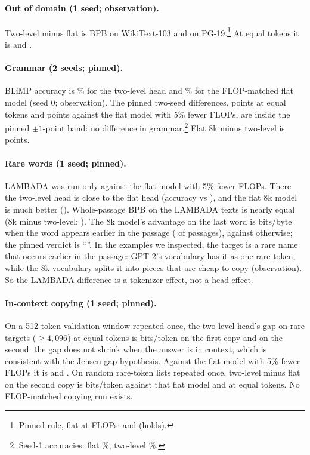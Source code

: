 \documentclass[11pt]{article}
\theoremstyle{remark}
\begin{document}
\paragraph{Out of domain (1 seed; observation).} Two-level minus flat is \OodWikiM{} BPB on WikiText-103 and \OodPgM{} on
PG-19.\footnote{Pinned rule, flat at \FlopsBThree{} FLOPs: \OodWiki{} and \OodPg{} (holds).} At equal tokens it is
\OodWikiTok{} and \OodPgTok{}.

\paragraph{Grammar (2 seeds; pinned).} BLiMP accuracy is \BlimpHs{}\% for the two-level head and \EvBmBlimp{}\% for the
FLOP-matched flat model (seed 0; observation). The pinned two-seed differences, \BlimpDMeanTok{} points at equal tokens and
\BlimpDMeanFlops{} points against the flat model with 5\% fewer FLOPs, are inside the pinned $\pm1$-point band: no difference in
grammar.\footnote{Seed-1 accuracies: flat \BlimpOneB{}\%, two-level \BlimpOneHs{}\%.} Flat 8k minus two-level is \BlimpDFeight{} points.

\paragraph{Rare words (1 seed; pinned).} LAMBADA was run only against the flat model with 5\% fewer FLOPs. There the two-level
head is close to the flat head (accuracy \LamHs{} vs \LamB{}), and the flat 8k model is much better (\LamFeight{}). Whole-passage
BPB on the LAMBADA texts is nearly equal (8k minus two-level: \LamWholeD{}). The 8k model's advantage on the last word is
\LamAdvEarlier{} bits/byte when the word appears earlier in the passage (\LamEarlierN{} of \LamN{} passages), against
\LamAdvRest{} otherwise; the pinned verdict is ``\LamVerdict''. In the examples we inspected, the target is a rare name that
occurs earlier in the passage: GPT-2's vocabulary has it as one rare token, while the 8k vocabulary splits it into pieces that are
cheap to copy (observation). So the LAMBADA difference is a tokenizer effect, not a head effect.

\paragraph{In-context copying (1 seed; pinned).} On a 512-token validation window repeated once, the two-level head's gap on rare
targets ($\ge 4{,}096$) at equal tokens is \CopyAOneBitsTok{} bits/token on the first copy and \CopyATwoBitsTok{} on the second:
the gap does not shrink when the answer is in context, which is consistent with the Jensen-gap hypothesis. Against the flat model with 5\%
fewer FLOPs it is \CopyAOneBitsFlops{} and \CopyATwoBitsFlops{}. On random rare-token lists repeated once, two-level minus flat on
the second copy is \CopyBTwoBitsFlops{} bits/token against that flat model and \CopyBTwoBitsTok{} at equal tokens. No
FLOP-matched copying run exists.
\end{document}
